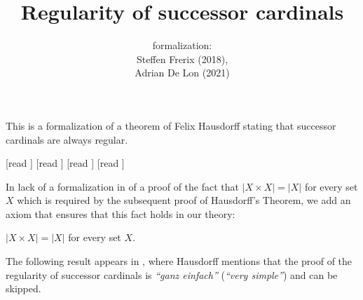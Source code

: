 \documentclass{article}
\title{Regularity of successor cardinals}
\author{\Naproche formalization:\\[0.5em]
Steffen Frerix (2018), \\
Adrian De Lon (2021)}
\date{}
\begin{document}
  \maketitle

  \noindent This is a formalization of a theorem of Felix Hausdorff stating that
  successor cardinals are always regular.

  \begin{imports}
    \begin{forthel}
      [read ]
      [read ]
      [read ]
      [read ]
    \end{forthel}
  \end{imports}

  In lack of a formalization in \Naproche of a proof of the fact that
  $|X \times X| = |X|$ for every set $X$ which is required by the subsequent
  proof of Hausdorff's Theorem, we add an axiom that ensures that this fact
  holds in our theory:

  \begin{forthel}
    \begin{axiom*}
      $|X \times X| = |X|$ for every set $X$.
    \end{axiom*}
  \end{forthel}

  The following result appears in \cite[p.~443]{Hausdorff1908},
  where Hausdorff mentions that the proof of the regularity of successor
  cardinals is \textit{``ganz einfach''} (\textit{``very simple''})
  and can be skipped.
\end{document}
